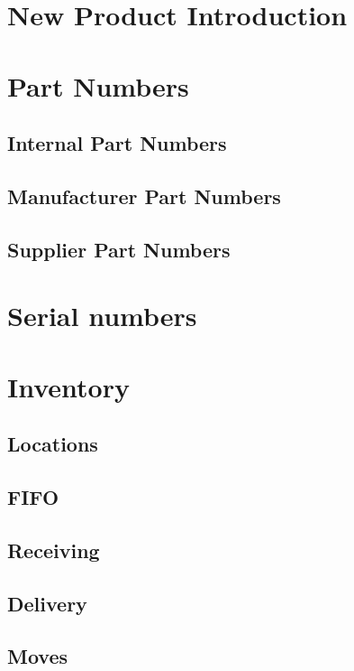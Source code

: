 %
%
%
%
%

\section{New Product Introduction}

\section{Part Numbers}
\subsection{Internal Part Numbers}
\subsection{Manufacturer Part Numbers}
\subsection{Supplier Part Numbers}

\section{Serial numbers}

\section{Inventory}
\subsection{Locations}
\subsection{FIFO}
\subsection{Receiving}
\subsection{Delivery}
\subsection{Moves}


